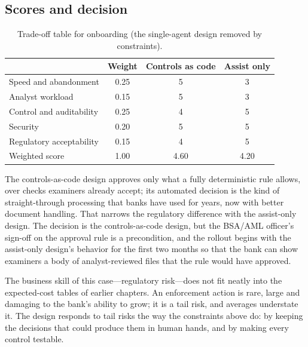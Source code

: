 \subsection{Scores and decision}

\begin{table}[htbp]
\centering
\small
\caption{Trade-off table for onboarding (the single-agent design removed by constraints).}
\label{tab:kyc-tradeoff}
\begin{tabular}{@{}lccc@{}}
\toprule
\rowcolor{coHead} & Weight & Controls as code & Assist only \\
\midrule
Speed and abandonment & 0.25 & 5 & 3 \\
Analyst workload & 0.15 & 5 & 3 \\
Control and auditability & 0.25 & 4 & 5 \\
Security & 0.20 & 5 & 5 \\
Regulatory acceptability & 0.15 & 4 & 5 \\
\midrule
\rowcolor{coAmberBg} Weighted score & 1.00 & 4.60 & 4.20 \\
\bottomrule
\end{tabular}
\end{table}

The controls-as-code design approves only what a fully deterministic rule allows, over checks examiners already accept; its automated decision is the kind of straight-through processing that banks have used for years, now with better document handling. That narrows the regulatory difference with the assist-only design. The decision is the controls-as-code design, but the BSA/AML officer's sign-off on the approval rule is a precondition, and the rollout begins with the assist-only design's behavior for the first two months so that the bank can show examiners a body of analyst-reviewed files that the rule would have approved.

The business skill of this case---regulatory risk---does not fit neatly into the expected-cost tables of earlier chapters. An enforcement action is rare, large and damaging to the bank's ability to grow; it is a tail risk, and averages understate it. The design responds to tail risks the way the constraints above do: by keeping the decisions that could produce them in human hands, and by making every control testable.
